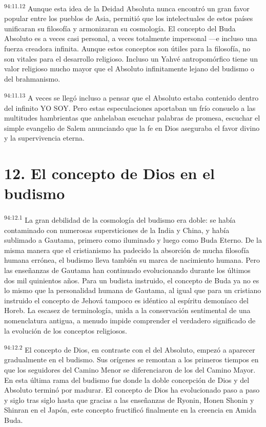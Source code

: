 \par
\textsuperscript{94:11.12} Aunque esta idea de la Deidad Absoluta nunca encontró un gran favor popular entre los pueblos de Asia, permitió que los intelectuales de estos países unificaran su filosofía y armonizaran su cosmología. El concepto del Buda Absoluto es a veces casi personal, a veces totalmente impersonal ---e incluso una fuerza creadora infinita. Aunque estos conceptos son útiles para la filosofía, no son vitales para el desarrollo religioso. Incluso un Yahvé antropomórfico tiene un valor religioso mucho mayor que el Absoluto infinitamente lejano del budismo o del brahmanismo.

\par
\textsuperscript{94:11.13} A veces se llegó incluso a pensar que el Absoluto estaba contenido dentro del infinito YO SOY. Pero estas especulaciones aportaban un frío consuelo a las multitudes hambrientas que anhelaban escuchar palabras de promesa, escuchar el simple evangelio de Salem anunciando que la fe en Dios aseguraba el favor divino y la supervivencia eterna.

\section*{12. El concepto de Dios en el budismo}
\par
\textsuperscript{94:12.1} La gran debilidad de la cosmología del budismo era doble: se había contaminado con numerosas supersticiones de la India y China, y había sublimado a Gautama, primero como iluminado y luego como Buda Eterno. De la misma manera que el cristianismo ha padecido la absorción de mucha filosofía humana errónea, el budismo lleva también su marca de nacimiento humana. Pero las enseñanzas de Gautama han continuado evolucionando durante los últimos dos mil quinientos años. Para un budista instruido, el concepto de Buda ya no es lo mismo que la personalidad humana de Gautama, al igual que para un cristiano instruido el concepto de Jehová tampoco es idéntico al espíritu demoníaco del Horeb. La escasez de terminología, unida a la conservación sentimental de una nomenclatura antigua, a menudo impide comprender el verdadero significado de la evolución de los conceptos religiosos.

\par
\textsuperscript{94:12.2} El concepto de Dios, en contraste con el del Absoluto, empezó a aparecer gradualmente en el budismo. Sus orígenes se remontan a los primeros tiempos en que los seguidores del Camino Menor se diferenciaron de los del Camino Mayor. En esta última rama del budismo fue donde la doble concepción de Dios y del Absoluto terminó por madurar. El concepto de Dios ha evolucionado paso a paso y siglo tras siglo hasta que gracias a las enseñanzas de Ryonin, Honen Shonin y Shinran en el Japón, este concepto fructificó finalmente en la creencia en Amida Buda.

